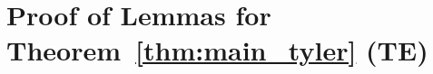 \documentclass[times,sort&compress,3p]{elsarticle}
\begin{document}
\section{Proof of Lemmas for Theorem~\ref{thm:main_tyler} (TE)}


\end{document}
